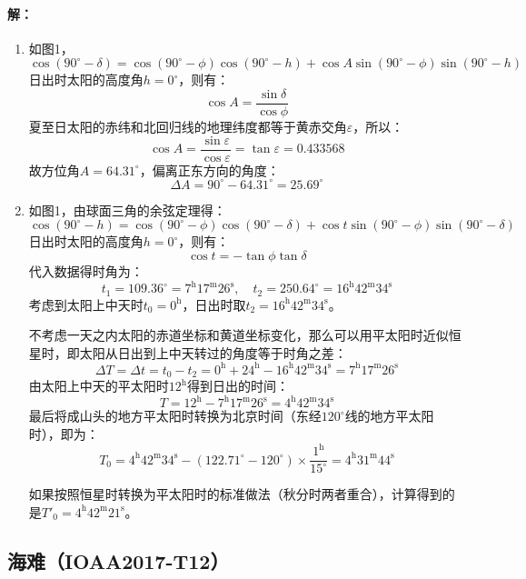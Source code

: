 \documentclass[a4paper]{article}
\renewcommand\epsilon{\varepsilon}
\begin{document}
\paragraph{解：}
\begin{enumerate}
    \item[(1)]
    如图1，
    \[
        \cos(90^\circ - \delta) = \cos(90^\circ - \phi)\cos(90^\circ - h) + \cos A\sin(90^\circ - \phi)\sin(90^\circ - h)
    \]
    日出时太阳的高度角$h = 0^\circ$，则有：
    \[
        \boxed{
            \cos A = \frac{\sin\delta}{\cos\phi}
        }
    \]
    夏至日太阳的赤纬和北回归线的地理纬度都等于黄赤交角$\epsilon$，所以：
    \[
        \cos A = \frac{\sin\epsilon}{\cos\epsilon} = \tan\epsilon = 0.433568
    \]
    故方位角$A = 64.31^\circ$，偏离正东方向的角度：
    \[
        \Delta A = 90^\circ - 64.31^\circ = 25.69^\circ
    \]

    \item[(2)]
    如图1，由球面三角的余弦定理得：
    \[
        \cos(90^\circ - h) = \cos(90^\circ - \phi)\cos(90^\circ - \delta) + \cos t\sin(90^\circ - \phi)\sin(90^\circ - \delta)
    \]
    日出时太阳的高度角$h = 0^\circ$，则有：
    \[
        \boxed{
            \cos t = -\tan\phi\tan\delta
        }
    \]
    代入数据得时角为：
    \[
        t_1 = 109.36^\circ = \mathrm{7^h17^m26^s},\quad
        t_2 = 250.64^\circ = \mathrm{16^h42^m34^s}
    \]
    考虑到太阳上中天时$t_0 = \mathrm{0^h}$，日出时取$t_2 = \mathrm{16^h42^m34^s}$。

    不考虑一天之内太阳的赤道坐标和黄道坐标变化，那么可以用平太阳时近似恒星时，即太阳从日出到上中天转过的角度等于时角之差：
    \[
        \Delta T = \Delta t = t_0 - t_2 = \mathrm{0^h} + \mathrm{24^h} - \mathrm{16^h42^m34^s} = \mathrm{7^h17^m26^s}
    \]
    由太阳上中天的平太阳时$\mathrm{12^h}$得到日出的时间：
    \[
        T = \mathrm{12^h} - \mathrm{7^h17^m26^s} = \mathrm{4^h42^m34^s}
    \]
    最后将成山头的地方平太阳时转换为北京时间（东经$120^\circ$线的地方平太阳时），即为：
    \[
        T_0 = \mathrm{4^h42^m34^s} - (122.71^\circ - 120^\circ) \times \frac{\mathrm{1^h}}{15^\circ} = \mathrm{4^h31^m44^s}
    \]

    如果按照恒星时转换为平太阳时的标准做法（秋分时两者重合），计算得到的是$T'_0 = \mathrm{4^h42^m21^s}$。

\end{enumerate}

\subsection{海难（IOAA2017-T12）}
\end{document}
